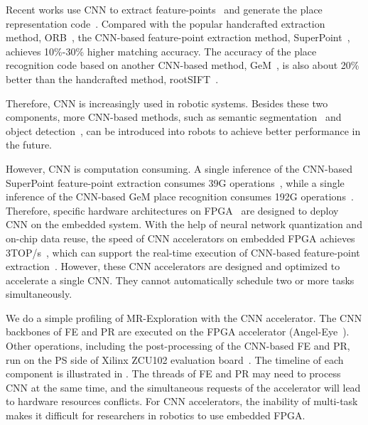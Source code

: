 Recent works use CNN to extract feature-points~\cite{detone2018superpoint, simo2015discriminative, yi2016lift} and generate the place representation code~\cite{arandjelovic2016netvlad, radenovic2018fine}. 
Compared with the popular handcrafted extraction method, ORB~\cite{Mur-Artal:2017281}, the CNN-based feature-point extraction method, SuperPoint~\cite{detone2018superpoint}, achieves 10\%-30\% higher matching accuracy.
The accuracy of the place recognition code based on another CNN-based method, GeM~\cite{radenovic2018fine}, is also about 20\% better than the handcrafted method, rootSIFT~\cite{jegou2014triang}.

Therefore, CNN is increasingly used in robotic systems. 
Besides these two components, more CNN-based methods, such as semantic segmentation~\cite{long2015fully} and object detection~\cite{ren2015faster}, can be introduced into robots to achieve better performance in the future. 

However, CNN is computation consuming. A single inference of the CNN-based SuperPoint feature-point extraction consumes 39G operations~\cite{detone2018superpoint}, while a single inference of the CNN-based GeM place recognition consumes 192G operations~\cite{radenovic2018fine}.
Therefore, specific hardware architectures on FPGA~\cite{guo2017angel,yu2018instruction,li_high_2016,qiu2016going,lu_evaluating_2017} are designed to deploy CNN on the embedded system.
With the help of neural network quantization and on-chip data reuse, the speed of CNN accelerators on embedded FPGA achieves 3TOP/s~\cite{lu_evaluating_2017}, which can support the real-time execution of CNN-based feature-point extraction~\cite{detone2018superpoint}.
However, these CNN accelerators are designed and optimized to accelerate a single CNN. They cannot automatically schedule two or more tasks simultaneously. 



We do a simple profiling of MR-Exploration with the CNN accelerator. The CNN backbones of FE and PR are executed on the FPGA accelerator (Angel-Eye~\cite{guo2017angel}).
Other operations, including the post-processing of the CNN-based FE and PR, run on the PS side of Xilinx ZCU102 evaluation board~\cite{zcu102}. The timeline of each component is illustrated in . 
The threads of FE and PR may need to process CNN at the same time, and the simultaneous requests of the accelerator will lead to hardware resources conflicts. For CNN accelerators, the inability of multi-task makes it difficult for researchers in robotics to use embedded FPGA.

